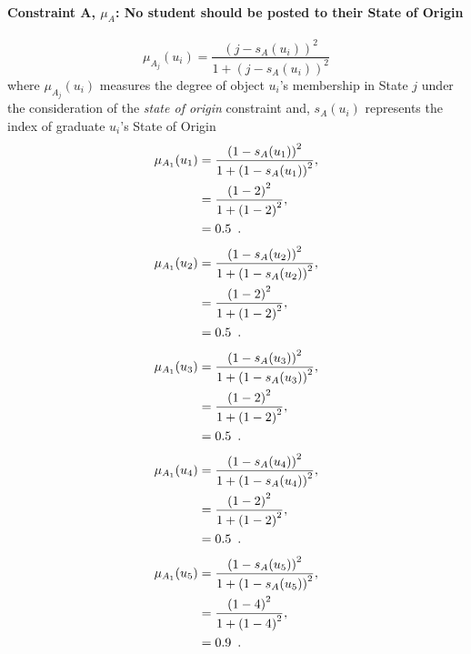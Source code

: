\documentclass[a4paper,openany]{book}
\begin{document}
			\paragraph{Constraint A, $\mu_A$: No student should be posted to their State of Origin}
				\begin{equation}
					\mu_{A_j}(u_i) = \frac{\left(j-s_A(u_i)\right)^2}{1 + \left(j-s_A(u_i)\right)^2}
				\end{equation}
				where $\mu_{A_j}(u_i)$ measures the degree of object $u_i$'s membership in State $j$ under the consideration of the \textit{state of origin} constraint and,
				$s_A(u_i)$ represents the index of graduate $u_i$'s State of Origin
				\begin{align}
					\mu_{A_1}(u_1) &= \frac{\left(1-s_A(u_1)\right)^2}{1 + \left(1-s_A(u_1)\right)^2} ,\\
					&= \frac{\left(1-2\right)^2}{1 + \left(1-2\right)^2} \notag ,\\
					&= 0.5 \enspace. \notag
				\end{align}
				\begin{align}
					\mu_{A_1}(u_2) &= \frac{\left(1-s_A(u_2)\right)^2}{1 + \left(1-s_A(u_2)\right)^2} ,\\
					&= \frac{\left(1-2\right)^2}{1 + \left(1-2\right)^2} \notag ,\\
					&= 0.5 \enspace. \notag
				\end{align}
				\begin{align}
					\mu_{A_1}(u_3) &= \frac{\left(1-s_A(u_3)\right)^2}{1 + \left(1-s_A(u_3)\right)^2} ,\\
					&= \frac{\left(1-2\right)^2}{1 + \left(1-2\right)^2} \notag ,\\
					&= 0.5 \enspace. \notag
				\end{align}
				\begin{align}
					\mu_{A_1}(u_4) &= \frac{\left(1-s_A(u_4)\right)^2}{1 + \left(1-s_A(u_4)\right)^2} ,\\
					&= \frac{\left(1-2\right)^2}{1 + \left(1-2\right)^2} \notag ,\\
					&= 0.5 \enspace. \notag
				\end{align}
				\begin{align}
					\mu_{A_1}(u_5) &= \frac{\left(1-s_A(u_5)\right)^2}{1 + \left(1-s_A(u_5)\right)^2} ,\\
					&= \frac{\left(1-4\right)^2}{1 + \left(1-4\right)^2} \notag ,\\
					&= 0.9 \enspace. \notag
				\end{align}
\end{document}
